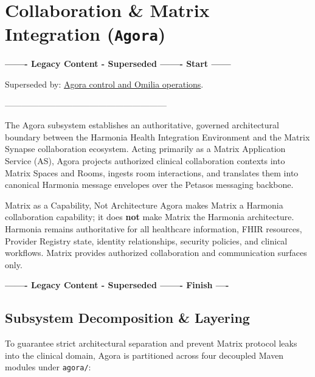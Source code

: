 
\chapter{Collaboration \& Matrix Integration (\texttt{Agora})}
\label{chap:collaboration_agora}


\par\noindent\textbf{------- Legacy Content - Superseded ------- Start ------}
\par\noindent Superseded by: \href{../../markdown/05-information-systems-architecture/agora-omilia-collaboration.md\#control-and-operations}{Agora control and Omilia operations}.
\par\noindent ---------------------------------------------------------

The Agora subsystem establishes an authoritative, governed architectural boundary between the Harmonia Health Integration Environment and the Matrix Synapse collaboration ecosystem. Acting primarily as a Matrix Application Service (AS), Agora projects authorized clinical collaboration contexts into Matrix Spaces and Rooms, ingests room interactions, and translates them into canonical Harmonia message envelopes over the Petasos messaging backbone.

\begin{principlebox}{Matrix as a Capability, Not Architecture}
Agora makes Matrix a Harmonia collaboration capability; it does \textbf{not} make Matrix the Harmonia architecture. Harmonia remains authoritative for all healthcare information, FHIR resources, Provider Registry state, identity relationships, security policies, and clinical workflows. Matrix provides authorized collaboration and communication surfaces only.
\end{principlebox}


\par\noindent\textbf{------- Legacy Content - Superseded ------- Finish ----}

\section{Subsystem Decomposition \& Layering}

To guarantee strict architectural separation and prevent Matrix protocol leaks into the clinical domain, Agora is partitioned across four decoupled Maven modules under \nolinkurl{agora/}:

